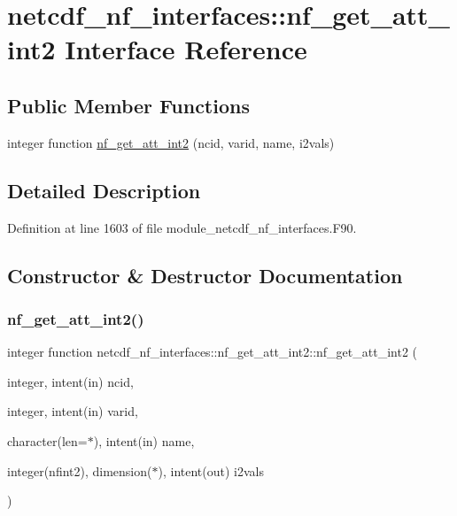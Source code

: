 \hypertarget{interfacenetcdf__nf__interfaces_1_1nf__get__att__int2}{}\section{netcdf\+\_\+nf\+\_\+interfaces\+:\+:nf\+\_\+get\+\_\+att\+\_\+int2 Interface Reference}
\label{interfacenetcdf__nf__interfaces_1_1nf__get__att__int2}
\subsection*{Public Member Functions}
\begin{DoxyCompactItemize}
\item 
integer function \hyperlink{interfacenetcdf__nf__interfaces_1_1nf__get__att__int2_acd3ff5e7fa5b11f1de2b5f94caa7b735}{nf\+\_\+get\+\_\+att\+\_\+int2} (ncid, varid, name, i2vals)
\end{DoxyCompactItemize}


\subsection{Detailed Description}


Definition at line 1603 of file module\+\_\+netcdf\+\_\+nf\+\_\+interfaces.\+F90.



\subsection{Constructor \& Destructor Documentation}
\mbox{\label{interfacenetcdf__nf__interfaces_1_1nf__get__att__int2_acd3ff5e7fa5b11f1de2b5f94caa7b735}} 
\subsubsection{\texorpdfstring{nf\+\_\+get\+\_\+att\+\_\+int2()}{nf\_get\_att\_int2()}}
{\footnotesize\ttfamily integer function netcdf\+\_\+nf\+\_\+interfaces\+::nf\+\_\+get\+\_\+att\+\_\+int2\+::nf\+\_\+get\+\_\+att\+\_\+int2 (\begin{DoxyParamCaption}\item[{integer, intent(in)}]{ncid,  }\item[{integer, intent(in)}]{varid,  }\item[{character(len=$\ast$), intent(in)}]{name,  }\item[{integer(nfint2), dimension($\ast$), intent(out)}]{i2vals }\end{DoxyParamCaption})}



